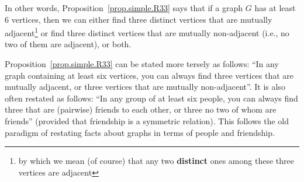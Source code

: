 \documentclass[numbers=enddot,12pt,final,onecolumn,notitlepage]{scrartcl}%
\theoremstyle{definition}
\begin{document}
In other words, Proposition~\ref{prop.simple.R33} says that if a graph
$G$ has at least $6$ vertices, then we can either find three distinct
vertices that are mutually adjacent\footnote{by which we mean (of
course) that any two \textbf{distinct} ones among these three vertices
are adjacent} or find three distinct vertices that are mutually
non-adjacent (i.e., no two of them are adjacent), or both.

Proposition~\ref{prop.simple.R33} can be stated more tersely as
follows: ``In any graph containing at least six vertices, you can
always find three vertices that are mutually adjacent, or three
vertices that are mutually non-adjacent''. It is also often restated
as follows:
``In any group of at least six people, you can always find three that
are (pairwise) friends to each other, or three no two of whom are
friends'' (provided that friendship is a symmetric relation). This
follows the old paradigm of restating facts about graphs in terms of
people and friendship.
\end{document}
